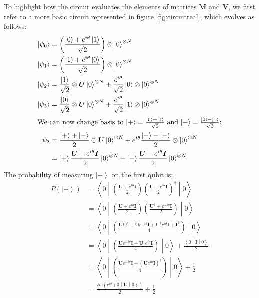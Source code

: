 \documentclass{aux/ttuthes2007}
\newcommand{\ket}[1]{\ensuremath{\left|#1\right\rangle}}
\newcommand{\sandwich}[3]{\left< #1 \middle\vert #2 \middle\vert #3 \right>}
\newcommand{\paren}[1]{\left( #1 \right)}
\newcommand{\elec}{N}
\begin{document}
To highlight how the circuit evaluates the elements of matrices $\bm M$ and $\bm V$, we first refer to a more basic circuit represented in figure \ref{fig:circuitreal}, which evolves as follows:
\begin{equation*}
	\begin{split}
		\ket {\psi_0}
		&= \paren{\frac{\ket 0 + e^{i\theta}\ket 1}{\sqrt 2}}\otimes \ket 0^{\otimes\elec} \\
		\ket {\psi_1}
		&= \paren{\frac{\ket 1 + e^{i\theta}\ket 0}{\sqrt 2}}\otimes \ket 0^{\otimes\elec} \\
		\ket {\psi_2}
		&= \frac{\ket 1}{\sqrt 2} \otimes \bm U \ket 0^{\otimes\elec} + \frac{e^{i\theta}}{\sqrt 2}\ket 0 \otimes \ket 0^{\otimes\elec} \\
		\ket {\psi_3}
		&= \frac{\ket 0}{\sqrt 2} \otimes \bm U \ket 0^{\otimes\elec} + \frac{e^{i\theta}}{\sqrt 2}\ket 1 \otimes \ket 0^{\otimes\elec} \\
		\intertext{\text{We can now change basis to 
		$\ket + = \frac{\ket 0 + \ket 1}{\sqrt 2}$
		and
		$\ket - = \frac{\ket 0 - \ket 1}{\sqrt 2}$:}}
		\psi_3
		&= \frac{\ket + + \ket -}{2} \otimes \bm U \ket 0^{\otimes\elec} + e^{i\theta}\frac{\ket + - \ket -}{2} \otimes \ket 0^{\otimes\elec} \\
		&= \ket + \frac{\bm U + e^{i\theta}\bm I}{2}\ket 0^{\otimes\elec} 
		+ \ket - \frac{\bm U - e^{i\theta}\bm I}{2}\ket 0^{\otimes\elec} 
	\end{split}
\end{equation*}
%
The probability of measuring $\ket +$ on the first qubit is:
%
\begin{equation*}
	\begin{split}
		P(\ket +)
		&= \sandwich 0 {
			\paren{\frac{\bm U + e^{i\theta}\bm I}{2}}
			\paren{\frac{\bm U + e^{i\theta}\bm I}{2}}^\dagger
		} 0 \\
		&= \sandwich 0 {
			\paren{\frac{\bm U + e^{i\theta}\bm I}{2}}
			\paren{\frac{\bm U^\dagger + e^{-i\theta}\bm I}{2}}
		} 0 \\
		&= \sandwich 0 {
			\paren{\frac{\bm U\bm U^\dagger + \bm Ue^{-i\theta}\bm I + \bm U^\dagger e^{i\theta}\bm I + \bm I^2}{4}}
		} 0 \\
		&= \sandwich 0 {
			\paren{\frac{\bm Ue^{-i\theta}\bm I + \bm U^\dagger e^{i\theta}\bm I}{4}}
		} 0 
		+ \frac{\sandwich 0 {\bm I} 0}{2} \\
		&= \sandwich 0 {
			\paren{\frac{\bm Ue^{-i\theta}\bm I + \paren{\bm Ue^{i\theta}\bm I}^\dagger}{4}}
		} 0 
		+ \frac{1}{2} \\
		&= \frac{Re \paren{e^{i\theta}\sandwich 0 { \bm U } 0}}{2}
		+ \frac{1}{2} \\
	\end{split}
\end{equation*}
\end{document}
